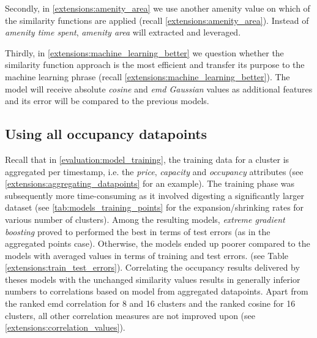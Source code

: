 Secondly, in \ref{extensions:amenity_area} we use another amenity value on which of the similarity functions are applied (recall \ref{extensions:amenity_area}). Instead of \textit{amenity time spent}, \textit{amenity area} will extracted and leveraged. 

Thirdly, in \ref{extensions:machine_learning_better} we question whether the similarity function approach is the most efficient and transfer its purpose to the machine learning phrase (recall \ref{extensions:machine_learning_better}). The model will receive absolute \textit{cosine} and \textit{emd Gaussian} values as additional features and its error will be compared to the previous models. 


\subsection{Using all occupancy datapoints}
\label{extensions:entire_datapoints}
Recall that in \ref{evaluation:model_training}, the training data for a cluster is aggregated per timestamp, i.e. the \textit{price}, \textit{capacity} and \textit{occupancy} attributes (see \ref{extensions:aggregating_datapoints} for an example). The training phase was subsequently more time-consuming as it involved digesting a significantly larger dataset (see \ref{tab:models_training_points} for the expansion/shrinking rates for various number of clusters). Among the resulting models, \textit{extreme gradient boosting} proved to performed the best in terms of test errors (as in the aggregated points case). Otherwise, the models ended up poorer compared to the models with averaged values in terms of training and test errors. (see Table \ref{extensions:train_test_errors}). Correlating the occupancy results delivered by theses models with the unchanged similarity values results in generally inferior numbers to correlations based on model from aggregated datapoints. Apart from the ranked emd correlation for 8 and 16 clusters and the ranked cosine for 16 clusters, all other correlation measures are not improved upon (see \ref{extensions:correlation_values}).

